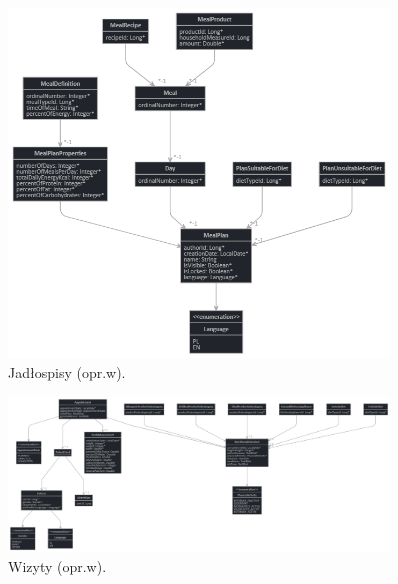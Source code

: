 \begin{minipage}{\textwidth}
    \begin{figure}[H]
        \centering\includegraphics[width=0.9\textwidth]{img/class-diagrams/jadospisy.png}
        \caption{Jadłospisy (opr.w).}\label{rysunek:jadlospisy}
    \end{figure}
\end{minipage}

\begin{minipage}{\textwidth}
    \begin{figure}[H]
        \centering\includegraphics[width=0.9\textwidth]{img/class-diagrams/wizyty.png}
        \caption{Wizyty (opr.w).}\label{rysunek:wizyty}
    \end{figure}
\end{minipage}

\thispagestyle{normal}

